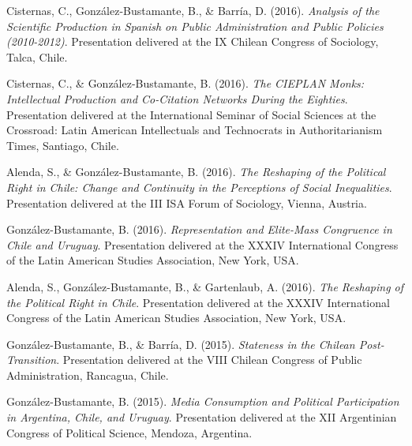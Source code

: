 \begin{publications}
\begin{benumerate}{66}
\item{\small Cisternas, C., González-Bustamante, B., \& Barría, D. (2016). {\itshape Analysis of the Scientific Production in Spanish on Public Administration and Public Policies (2010-2012)}. Presentation delivered at the IX Chilean Congress of Sociology, Talca, Chile.}\vspace{1mm}

\item{\small Cisternas, C., \& González-Bustamante, B. (2016). {\itshape The CIEPLAN Monks: Intellectual Production and Co-Citation Networks During the Eighties}. Presentation delivered at the International Seminar of Social Sciences at the Crossroad: Latin American Intellectuals and Technocrats in Authoritarianism Times, Santiago, Chile.}\vspace{1mm}

\item{\small Alenda, S., \& González-Bustamante, B. (2016). {\itshape The Reshaping of the Political Right in Chile: Change and Continuity in the Perceptions of Social Inequalities}. Presentation delivered at the III ISA Forum of Sociology, Vienna, Austria.}\vspace{1mm}

\item{\small González-Bustamante, B. (2016). {\itshape Representation and Elite-Mass Congruence in Chile and Uruguay}. Presentation delivered at the XXXIV International Congress of the Latin American Studies Association, New York, USA.}\vspace{1mm}

\item{\small Alenda, S., González-Bustamante, B., \& Gartenlaub, A. (2016). {\itshape The Reshaping of the Political Right in Chile}. Presentation delivered at the XXXIV International Congress of the Latin American Studies Association, New York, USA.}\vspace{1mm}

\item{\small González-Bustamante, B., \& Barría, D. (2015). {\itshape Stateness in the Chilean Post-Transition}. Presentation delivered at the VIII Chilean Congress of Public Administration, Rancagua, Chile.}\vspace{1mm}

\item{\small González-Bustamante, B. (2015). {\itshape Media Consumption and Political Participation in Argentina, Chile, and Uruguay}. Presentation delivered at the XII Argentinian Congress of Political Science, Mendoza, Argentina.}\vspace{1mm}


\end{benumerate}
\end{publications}
